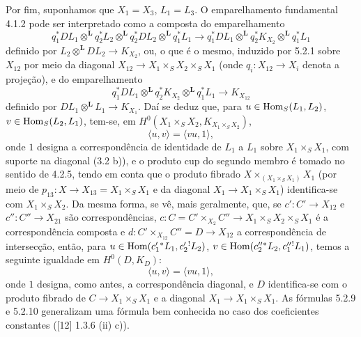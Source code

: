 Por fim, suponhamos que $X_1=X_3$, $L_1=L_3$. O emparelhamento fundamental 4.1.2 pode ser interpretado como a composta do emparelhamento
\begin{equation}
\tag{5.2.7}
q_1^*DL_1\otimes^{\mathbf L}q_2^*L_2\otimes^{\mathbf L}q_2^*DL_2\otimes^{\mathbf L}q_1^*L_1
\longrightarrow
q_1^*DL_1\otimes^{\mathbf L}q_2^*K_{X_2}\otimes^{\mathbf L}q_1^*L_1
\end{equation}
definido por $L_2\otimes^{\mathbf L}DL_2\to K_{X_2}$, ou, o que é o mesmo, induzido por 5.2.1 sobre $X_{12}$ por meio da diagonal $X_{12}\to X_1\times_SX_2\times_SX_1$ (onde $q_i:X_{12}\to X_i$ denota a projeção), e do emparelhamento
\begin{equation}
\tag{5.2.8}
q_1^*DL_1\otimes^{\mathbf L}q_2^*K_{X_2}\otimes^{\mathbf L}q_1^*L_1\longrightarrow K_{X_{12}}
\end{equation}
definido por $DL_1\otimes^{\mathbf L}L_1\to K_{X_1}$. Daí se deduz que, para $u\in\operatorname{Hom}_S(L_1,L_2)$, $v\in\operatorname{Hom}_S(L_2,L_1)$, tem-se, em $H^0(X_1\times_SX_2,K_{X_1\times_SX_2})$,
\begin{equation}
\tag{5.2.9}
\langle u,v\rangle=\langle vu,1\rangle,
\end{equation}
onde $1$ designa a correspondência de identidade de $L_1$ a $L_1$ sobre $X_1\times_SX_1$, com suporte na diagonal (3.2 b)), e o produto cup do segundo membro é tomado no sentido de 4.2.5, tendo em conta que o produto fibrado $X\times_{(X_1\times_SX_1)}X_1$ (por meio de $p_{13}:X\to X_{13}=X_1\times_SX_1$ e da diagonal $X_1\to X_1\times_SX_1$) identifica-se com $X_1\times_SX_2$. Da mesma forma, se vê, mais geralmente, que, se $c':C'\to X_{12}$ e $c'':C''\to X_{21}$ são correspondências, $c:C=C'\times_{X_2}C''\to X_1\times_SX_2\times_SX_1$ é a correspondência composta e $d:C'\times_{X_{12}}C''=D\to X_{12}$ a correspondência de intersecção, então, para $u\in\operatorname{Hom}(c_1'{}^*L_1,c_2'{}^!L_2)$, $v\in\operatorname{Hom}(c_2''{}^*L_2,c_1''{}^!L_1)$, temos a seguinte igualdade em $H^0(D,K_D)$:
\begin{equation}
\tag{5.2.10}
\langle u,v\rangle=\langle vu,1\rangle,
\end{equation}
onde $1$ designa, como antes, a correspondência diagonal, e $D$ identifica-se com o produto fibrado de $C\to X_1\times_SX_1$ e a diagonal $X_1\to X_1\times_SX_1$. As fórmulas 5.2.9 e 5.2.10 generalizam uma fórmula bem conhecida no caso dos coeficientes constantes ([12] 1.3.6 (ii) c)).
